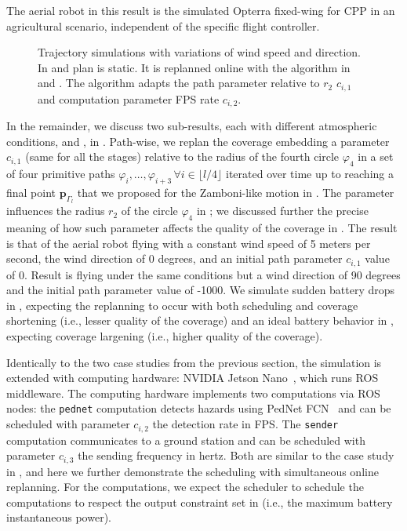 The aerial robot in this result is the simulated Opterra fixed-wing for CPP in an agricultural scenario, independent of the specific flight controller. 
\begin{figure}[h!]
  \centering
  \selectfont
  \footnotesize    
  
  \caption[Numerical simulations of the trajectory with static and dynamic plans]{Trajectory simulations with variations of wind speed and direction. In  and  plan is static. It is replanned online with the algorithm in  and . The algorithm adapts the path parameter relative to $r_2$ $c_{i,1}$ and computation parameter FPS rate $c_{i,2}$.}
  \label{fig:trajs-revised}
\end{figure}
In the remainder, we discuss two sub-results, each with different atmospheric conditions,  and , in . Path-wise, we replan the coverage embedding a parameter $c_{i,1}$ (same for all the stages) relative to the radius of the fourth circle $\varphi_4$ in a set of four primitive paths $\varphi_{i},\dots,\varphi_{i+3}\,\forall i\in\lfloor l/4 \rfloor$ iterated over time up to reaching a final point $\mathbf{p}_{\Gamma_l}$ that we proposed for the Zamboni-like motion in . The parameter influences the radius $r_2$ of the circle $\varphi_4$ in ; we discussed further the precise meaning of how such parameter affects the quality of the coverage in . The result  is that of the aerial robot flying with a constant wind speed of 5 meters per second, the wind direction of 0 degrees, and an initial path parameter $c_{i,1}$ value of 0. Result  is flying under the same conditions but a wind direction of 90 degrees and the initial path parameter value of -1000. We simulate sudden battery drops in , expecting the replanning to occur with both scheduling and coverage shortening (i.e., lesser quality of the coverage) and an ideal battery behavior in , expecting coverage largening (i.e., higher quality of the coverage).

Identically to the two case studies from the previous section, the simulation is extended with computing hardware: NVIDIA Jetson Nano~\citep{nano}, which runs ROS middleware. The computing hardware implements two computations via ROS nodes: the {\small\tt pednet} computation detects hazards using PedNet FCN~\citep{ullah2018pednet} and can be scheduled with parameter $c_{i,2}$ the detection rate in FPS. The {\small\tt sender} computation communicates to a ground station and can be scheduled with parameter $c_{i,3}$ the sending frequency in hertz. Both are similar to the case study in , and here we further demonstrate the scheduling with simultaneous online replanning. For the computations, we expect the scheduler to schedule the computations to respect the output constraint set in  (i.e., the maximum battery instantaneous power).

